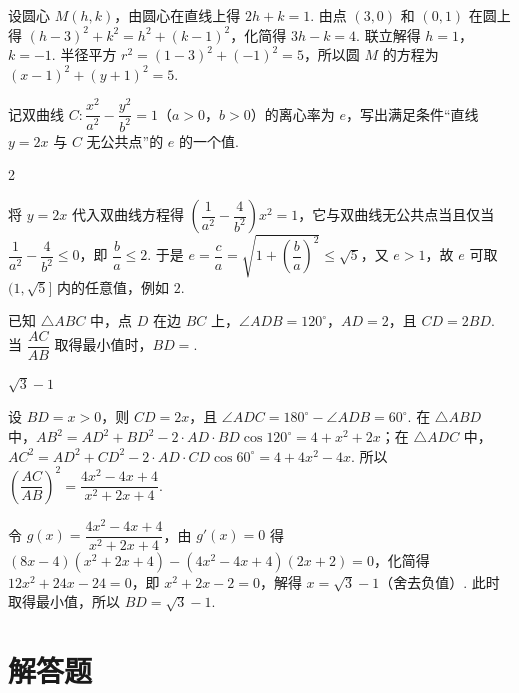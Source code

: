 \begin{solution}
设圆心 \(M(h,k)\)，由圆心在直线上得 \(2h+k=1\). 由点 \((3,0)\) 和 \((0,1)\) 在圆上得 \((h-3)^2+k^2=h^2+(k-1)^2\)，化简得 \(3h-k=4\). 联立解得 \(h=1\)，\(k=-1\). 半径平方 \(r^2=(1-3)^2+(-1)^2=5\)，所以圆 \(M\) 的方程为 \((x-1)^2+(y+1)^2=5\).
\end{solution}

\begin{problem}
记双曲线 \(C:\dfrac{x^2}{a^2}-\dfrac{y^2}{b^2}=1\)（\(a>0\)，\(b>0\)）的离心率为 \(e\)，写出满足条件“直线 \(y=2x\) 与 \(C\) 无公共点”的 \(e\) 的一个值\fillinblank{}.
\end{problem}

\begin{answer}
2
\end{answer}

\begin{solution}
将 \(y=2x\) 代入双曲线方程得 \(\left(\dfrac1{a^2}-\dfrac4{b^2}\right)x^2=1\)，它与双曲线无公共点当且仅当 \(\dfrac1{a^2}-\dfrac4{b^2}\le0\)，即 \(\dfrac ba\le2\). 于是 \(e=\dfrac ca=\sqrt{1+\left(\dfrac ba\right)^2}\le\sqrt5\)，又 \(e>1\)，故 \(e\) 可取 \((1,\sqrt5]\) 内的任意值，例如 \(2\).
\end{solution}

\begin{problem}
已知 \(\triangle ABC\) 中，点 \(D\) 在边 \(BC\) 上，\(\angle ADB=120^\circ\)，\(AD=2\)，且 \(CD=2BD\). 当 \(\dfrac{AC}{AB}\) 取得最小值时，\(BD=\)\fillinblank{}.
\end{problem}

\begin{answer}
\(\sqrt{3}-1\)
\end{answer}

\begin{solution}
设 \(BD=x>0\)，则 \(CD=2x\)，且 \(\angle ADC=180^\circ-\angle ADB=60^\circ\). 在 \(\triangle ABD\) 中，\(AB^2=AD^2+BD^2-2\cdot AD\cdot BD\cos120^\circ=4+x^2+2x\)；在 \(\triangle ADC\) 中，\(AC^2=AD^2+CD^2-2\cdot AD\cdot CD\cos60^\circ=4+4x^2-4x\). 所以 \(\left(\dfrac{AC}{AB}\right)^2=\dfrac{4x^2-4x+4}{x^2+2x+4}\).

令 \(g(x)=\dfrac{4x^2-4x+4}{x^2+2x+4}\)，由 \(g'(x)=0\) 得 \((8x-4)(x^2+2x+4)-(4x^2-4x+4)(2x+2)=0\)，化简得 \(12x^2+24x-24=0\)，即 \(x^2+2x-2=0\)，解得 \(x=\sqrt3-1\)（舍去负值）. 此时取得最小值，所以 \(BD=\sqrt3-1\).
\end{solution}

\section{解答题}

